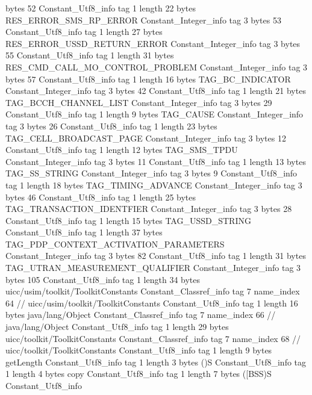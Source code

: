 {{{			bytes	52
		}
		Constant_Utf8_info {
			tag	1
			length	22
			bytes	RES_ERROR_SMS_RP_ERROR
		}
		Constant_Integer_info {
			tag	3
			bytes	53
		}
		Constant_Utf8_info {
			tag	1
			length	27
			bytes	RES_ERROR_USSD_RETURN_ERROR
		}
		Constant_Integer_info {
			tag	3
			bytes	55
		}
		Constant_Utf8_info {
			tag	1
			length	31
			bytes	RES_CMD_CALL_MO_CONTROL_PROBLEM
		}
		Constant_Integer_info {
			tag	3
			bytes	57
		}
		Constant_Utf8_info {
			tag	1
			length	16
			bytes	TAG_BC_INDICATOR
		}
		Constant_Integer_info {
			tag	3
			bytes	42
		}
		Constant_Utf8_info {
			tag	1
			length	21
			bytes	TAG_BCCH_CHANNEL_LIST
		}
		Constant_Integer_info {
			tag	3
			bytes	29
		}
		Constant_Utf8_info {
			tag	1
			length	9
			bytes	TAG_CAUSE
		}
		Constant_Integer_info {
			tag	3
			bytes	26
		}
		Constant_Utf8_info {
			tag	1
			length	23
			bytes	TAG_CELL_BROADCAST_PAGE
		}
		Constant_Integer_info {
			tag	3
			bytes	12
		}
		Constant_Utf8_info {
			tag	1
			length	12
			bytes	TAG_SMS_TPDU
		}
		Constant_Integer_info {
			tag	3
			bytes	11
		}
		Constant_Utf8_info {
			tag	1
			length	13
			bytes	TAG_SS_STRING
		}
		Constant_Integer_info {
			tag	3
			bytes	9
		}
		Constant_Utf8_info {
			tag	1
			length	18
			bytes	TAG_TIMING_ADVANCE
		}
		Constant_Integer_info {
			tag	3
			bytes	46
		}
		Constant_Utf8_info {
			tag	1
			length	25
			bytes	TAG_TRANSACTION_IDENTFIER
		}
		Constant_Integer_info {
			tag	3
			bytes	28
		}
		Constant_Utf8_info {
			tag	1
			length	15
			bytes	TAG_USSD_STRING
		}
		Constant_Utf8_info {
			tag	1
			length	37
			bytes	TAG_PDP_CONTEXT_ACTIVATION_PARAMETERS
		}
		Constant_Integer_info {
			tag	3
			bytes	82
		}
		Constant_Utf8_info {
			tag	1
			length	31
			bytes	TAG_UTRAN_MEASUREMENT_QUALIFIER
		}
		Constant_Integer_info {
			tag	3
			bytes	105
		}
		Constant_Utf8_info {
			tag	1
			length	34
			bytes	uicc/usim/toolkit/ToolkitConstants
		}
		Constant_Classref_info {
			tag	7
			name_index	64		// uicc/usim/toolkit/ToolkitConstants
		}
		Constant_Utf8_info {
			tag	1
			length	16
			bytes	java/lang/Object
		}
		Constant_Classref_info {
			tag	7
			name_index	66		// java/lang/Object
		}
		Constant_Utf8_info {
			tag	1
			length	29
			bytes	uicc/toolkit/ToolkitConstants
		}
		Constant_Classref_info {
			tag	7
			name_index	68		// uicc/toolkit/ToolkitConstants
		}
		Constant_Utf8_info {
			tag	1
			length	9
			bytes	getLength
		}
		Constant_Utf8_info {
			tag	1
			length	3
			bytes	()S
		}
		Constant_Utf8_info {
			tag	1
			length	4
			bytes	copy
		}
		Constant_Utf8_info {
			tag	1
			length	7
			bytes	([BSS)S
		}
		Constant_Utf8_info {
}}}
